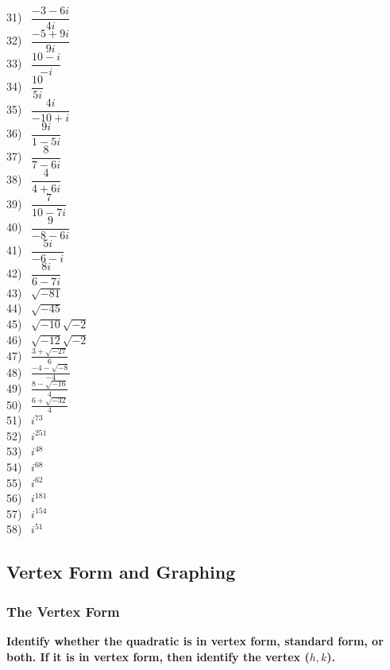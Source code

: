 \documentclass[12pt]{book}
\theoremstyle{definition}
\begin{document}
\begin{multicols}{3}
  31)~ $\dfrac{- 3 - 6 i}{4 i}$\\
  32)~ $\dfrac{- 5 + 9 i}{9 i}$\\
  33)~ $\dfrac{10 - i}{- i}$\\
  34)~ $\dfrac{10}{5 i}$\\
  35)~ $\dfrac{4 i}{- 10 + i}$\\
  36)~ $\dfrac{9 i}{1 - 5 i}$\\
  37)~ $\dfrac{8}{7 - 6 i}$\\
  38)~ $\dfrac{4}{4 + 6 i}$\\
  39)~ $\dfrac{7}{10 - 7 i}$\\
  40)~ $\dfrac{9}{- 8 - 6 i}$\\
  41)~ $\dfrac{5 i}{- 6 - i}$\\
  42)~ $\dfrac{8 i}{6 - 7 i}$\\
  43)~ $\sqrt{- 81}$\\
  44)~ $\sqrt{- 45}$\\
  45)~ $\sqrt{- 10} \sqrt{- 2}$\\
  46)~ $\sqrt{- 12} \sqrt{- 2}$\\
  47)~ $\frac{3 + \sqrt{- 27}}{6}$\\
  48)~ $\frac{- 4 - \sqrt{- 8}}{- 4}$\\
  49)~ $\frac{8 - \sqrt{- 16}}{4}$\\
  50)~ $\frac{6 + \sqrt{- 32}}{4}$\\
  51)~ $i^{73}$\\
  52)~ $i^{251}$\\
  53)~ $i^{48}$\\
  54)~ $i^{68}$\\
  55)~ $i^{62}$\\
  56)~ $i^{181}$\\
  57)~ $i^{154}$\\
  58)~ $i^{51}$
\end{multicols}

\subsection*{Vertex Form and Graphing}

\subsubsection{The Vertex Form}

{\bf Identify whether the quadratic is in vertex form, standard form, or both.  If it is in vertex form, then identify the vertex ($h,k$).}
\end{document}
